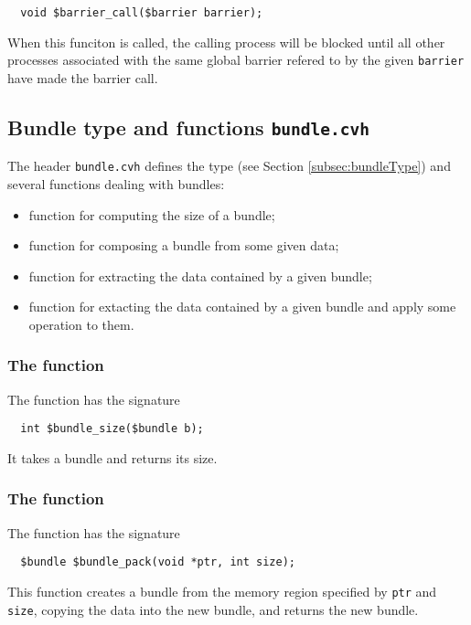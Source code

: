 \begin{verbatim}
  void $barrier_call($barrier barrier);
\end{verbatim}

When this funciton is called, the calling process will be blocked until all other processes associated with the same global barrier refered to by the given \texttt{barrier} have made the barrier call.

\subsection{Bundle type and functions \texttt{bundle.cvh}}
\label{subsec:bundleLibrary}

The header \texttt{bundle.cvh} defines the type \cbundle{} (see Section \ref{subsec:bundleType}) and several functions dealing with bundles:
\begin{itemize}
\item function \cbundlesize{} for computing the size of a bundle;
\item function \cbundlepack{} for composing a bundle from some given data;
\item function \cbundleunpack{} for extracting the data contained by a given bundle;
\item function \cbundleunpackapply{} for extacting the data contained by a given bundle and apply some operation to them.
\end{itemize}

\subsubsection{The \cbundlesize{} function}

The \cbundlesize{} function has the signature
\begin{verbatim}
  int $bundle_size($bundle b);
\end{verbatim}

It takes a bundle and returns its size.

\subsubsection{The \cbundlepack{} function}

The \cbundlepack{} function has the signature
\begin{verbatim}
  $bundle $bundle_pack(void *ptr, int size);
\end{verbatim}

This function creates a bundle from the memory region specified by \texttt{ptr} and \texttt{size}, copying the data into the new bundle, and returns the new bundle.

